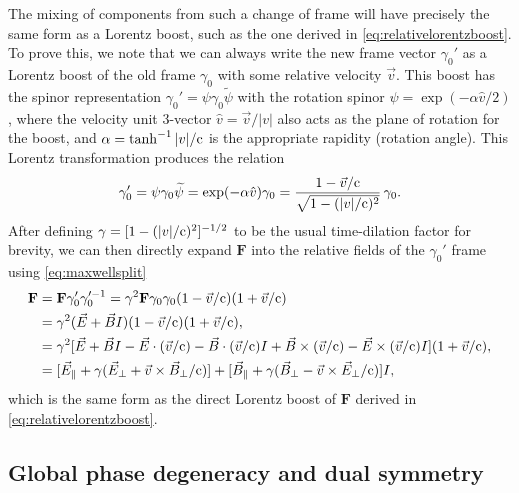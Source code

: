 \documentclass[1p,sort&compress]{elsarticle}
\numberwithin{equation}{section}
\newcommand{\rv}[1]{\vec{#1}}
\newcommand{\bv}[1]{\mathbf{#1}}
\newcommand{\cc}{{\rm c}}
\begin{document}
The mixing of components from such a change of frame will have precisely the same form as a Lorentz boost, such as the one derived in \eqref{eq:relativelorentzboost}.  To prove this, we note that we can always write the new frame vector $\gamma_0'$ as a Lorentz boost of the old frame $\gamma_0$ with some relative velocity $\rv{v}$.  This boost has the spinor representation $\gamma_0' = \psi \gamma_0 \widetilde{\psi}$ with the rotation spinor $\psi = \exp(-\alpha \hat{v}/2)$, where the velocity unit 3-vector $\hat{v} = \rv{v}/|v|$ also acts as the plane of rotation for the boost, and $\alpha = \tanh^{-1}|v|/\cc$ is the appropriate rapidity (rotation angle).  This Lorentz transformation produces the relation
\begin{align}
  \gamma_0' = \psi\gamma_0\widetilde{\psi} = \exp(-\alpha \hat{v})\gamma_0 = \frac{1 - \rv{v}/\cc}{\sqrt{1-(|v|/\cc)^2}}\,\gamma_0.
\end{align}
After defining $\gamma = [1 - (|v|/\cc)^2]^{-1/2}$ to be the usual time-dilation factor for brevity, we can then directly expand $\bv{F}$ into the relative fields of the $\gamma_0'$ frame using \eqref{eq:maxwellsplit} 
\begin{align}\label{eq:relativelorentzboost2}
  \bv{F} &= \bv{F}\gamma_0'\gamma_0'^{-1} = \gamma^2 \bv{F}\gamma_0\gamma_0(1-\rv{v}/\cc)(1+\rv{v}/\cc) \\
  &= \gamma^2(\rv{E} + \rv{B}I)(1-\rv{v}/\cc)(1+\rv{v}/\cc), \nonumber \\
  &= \gamma^2[\rv{E} + \rv{B}I - \rv{E}\cdot(\rv{v}/\cc) - \rv{B}\cdot(\rv{v}/\cc) I + \rv{B}\times(\rv{v}/\cc) - \rv{E}\times(\rv{v}/\cc) I](1+\rv{v}/\cc), \nonumber \\
  &= [\rv{E}_\parallel + \gamma(\rv{E}_\perp + \rv{v}\times\rv{B}_\perp/\cc)] + [\rv{B}_\parallel + \gamma(\rv{B}_\perp - \rv{v}\times\rv{E}_\perp/\cc)] I, \nonumber
\end{align}
which is the same form as the direct Lorentz boost of $\bv{F}$ derived in \eqref{eq:relativelorentzboost}.


\subsection{Global phase degeneracy and dual symmetry}\label{sec:dualsym}

\end{document}
